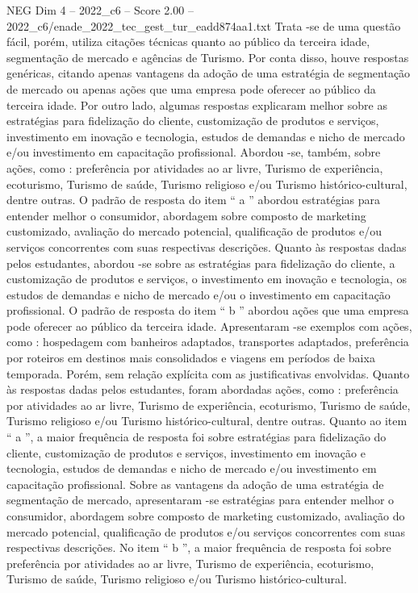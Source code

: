 \begin{textsample}{NEG Dim 4 – 2022\_c6 – Score 2.00 – 2022\_c6/enade\_2022\_tec\_gest\_tur\_eadd874aa1.txt}
Trata -se de uma questão fácil, porém, utiliza citações técnicas quanto ao público da terceira idade, segmentação de mercado e agências de Turismo.
Por conta disso, houve respostas genéricas, citando apenas vantagens da adoção de uma estratégia de segmentação de mercado ou apenas ações que uma empresa pode oferecer ao público da terceira idade.
Por outro lado, algumas respostas explicaram melhor sobre as estratégias para fidelização do cliente, customização de produtos e serviços, investimento em inovação e tecnologia, estudos de demandas e nicho de mercado e/ou investimento em capacitação profissional.
Abordou -se, também, sobre ações, como : preferência por atividades ao ar livre, Turismo de experiência, ecoturismo, Turismo de saúde, Turismo religioso e/ou Turismo histórico-cultural, dentre outras.
O padrão de resposta do item “ a ” abordou estratégias para entender melhor o consumidor, abordagem sobre composto de marketing customizado, avaliação do mercado potencial, qualificação de produtos e/ou serviços concorrentes com suas respectivas descrições.
Quanto às respostas dadas pelos estudantes, abordou -se sobre as estratégias para fidelização do cliente, a customização de produtos e serviços, o investimento em inovação e tecnologia, os estudos de demandas e nicho de mercado e/ou o investimento em capacitação profissional.
O padrão de resposta do item “ b ” abordou ações que uma empresa pode oferecer ao público da terceira idade.
Apresentaram -se exemplos com ações, como : hospedagem com banheiros adaptados, transportes adaptados, preferência por roteiros em destinos mais consolidados e viagens em períodos de baixa temporada.
Porém, sem relação explícita com as justificativas envolvidas.
Quanto às respostas dadas pelos estudantes, foram abordadas ações, como : preferência por atividades ao ar livre, Turismo de experiência, ecoturismo, Turismo de saúde, Turismo religioso e/ou Turismo histórico-cultural, dentre outras.
Quanto ao item “ a ”, a maior frequência de resposta foi sobre estratégias para fidelização do cliente, customização de produtos e serviços, investimento em inovação e tecnologia, estudos de demandas e nicho de mercado e/ou investimento em capacitação profissional.
Sobre as vantagens da adoção de uma estratégia de segmentação de mercado, apresentaram -se estratégias para entender melhor o consumidor, abordagem sobre composto de marketing customizado, avaliação do mercado potencial, qualificação de produtos e/ou serviços concorrentes com suas respectivas descrições.
No item “ b ”, a maior frequência de resposta foi sobre preferência por atividades ao ar livre, Turismo de experiência, ecoturismo, Turismo de saúde, Turismo religioso e/ou Turismo histórico-cultural.

\end{textsample}
